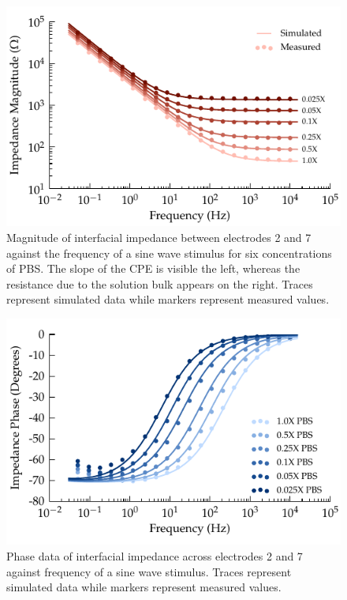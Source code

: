 \documentclass[journal, a4paper]{IEEEtran}
\begin{document}
{\begin{figure}
    \begin{center}
        \includegraphics{graphics/displacement_impedanceVsFrequency_magnitude}
    \end{center}
    \caption{Magnitude of interfacial impedance between electrodes 2 and 7 against the frequency of a sine wave stimulus for six concentrations of PBS. The slope of the CPE is visible the left, whereas the resistance due to the solution bulk appears on the right. Traces represent simulated data while markers represent measured values.}
    \label{fig:CPE_Magnitude}
\end{figure}

\begin{figure}
    \begin{center}
        \includegraphics{graphics/displacement_impedanceVsFrequency_phase}
    \end{center}
    \caption{Phase data of interfacial impedance across electrodes 2 and 7 against frequency of a sine wave stimulus. Traces represent simulated data while markers represent measured values.}
    \label{fig:CPE_Phase}
\end{figure}

}
\end{document}
